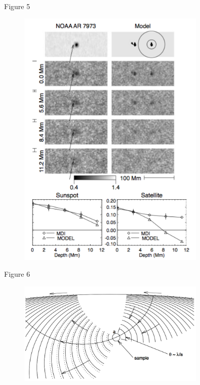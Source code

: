 \documentclass{beamer}
\begin{document}
\begin{frame}{Figure 5}
    \begin{figure}
        \includegraphics[width=0.8\textwidth]{fig_5.png}
    \end{figure}
\end{frame}

\begin{frame}{Figure 6}
    \begin{figure}
        \includegraphics[width=0.8\textwidth]{fig_6.png}
    \end{figure}
\end{frame}
\end{document}
